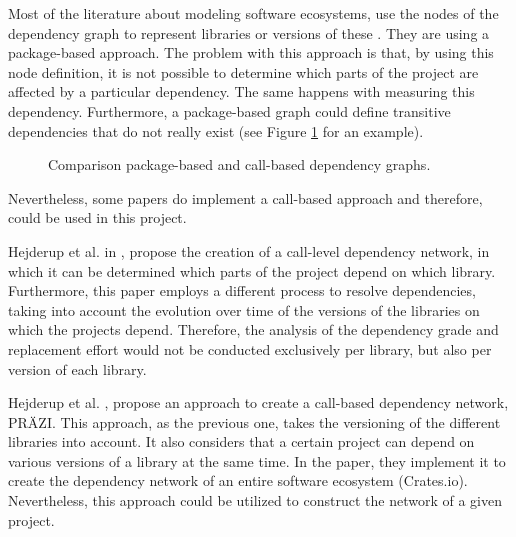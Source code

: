 Most of the literature about modeling software ecosystems, use the nodes of the dependency graph to represent libraries or versions of these \cite{decan2017empirical, hejderup2015dependencies, kikas2017structure}. They are using a package-based approach. The problem with this approach is that, by using this node definition, it is not possible to determine which parts of the project are affected by a particular dependency. The same happens with measuring this dependency. Furthermore, a package-based graph could define transitive dependencies that do not really exist (see Figure \ref{fig:example-call-based} for an example).

\begin{figure}[ht!]
    \centering
    \caption{Comparison package-based and call-based dependency graphs.}
    \label{fig:example-call-based}
\end{figure}

\bigskip\noindent
Nevertheless, some papers do implement a call-based approach and therefore, could be used in this project.

Hejderup et al. in \cite{hejderup2018software}, propose the creation of a call-level dependency network, in which it can be determined which parts of the project depend on which library. Furthermore, this paper employs a different process to resolve dependencies, taking into account the evolution over time of the versions of the libraries on which the projects depend. Therefore, the analysis of the dependency grade and replacement effort would not be conducted exclusively per library, but also per version of each library.

 Hejderup et al. \cite{hejderup2018prazi}, propose an approach to create a call-based dependency network, PRÄZI. This approach, as the previous one, takes the versioning of the different libraries into account. It also considers that a certain project can depend on various versions of a library at the same time. In the paper, they implement it to create the dependency network of an entire software ecosystem (Crates.io). Nevertheless, this approach could be utilized to construct the network of a given project.

